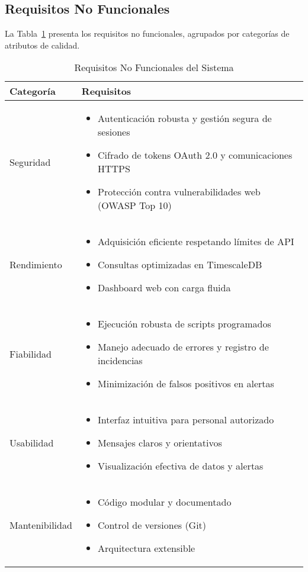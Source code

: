 \subsection{Requisitos No Funcionales}
\label{subsec:requisitos_no_funcionales}

La Tabla~\ref{tab:requisitos_no_funcionales} presenta los requisitos no funcionales, agrupados por categorías de atributos de calidad.
\begin{table}[htbp]
\caption{Requisitos No Funcionales del Sistema}
\label{tab:requisitos_no_funcionales}
\begin{tabular}{|p{}|p{}|}
\hline
\textbf{Categoría} & \textbf{Requisitos} \\
\hline
Seguridad & 
\begin{itemize}
\item Autenticación robusta y gestión segura de sesiones
\item Cifrado de tokens OAuth 2.0 y comunicaciones HTTPS
\item Protección contra vulnerabilidades web (OWASP Top 10)
\end{itemize} \\
\hline
Rendimiento & 
\begin{itemize}
\item Adquisición eficiente respetando límites de API
\item Consultas optimizadas en TimescaleDB
\item Dashboard web con carga fluida
\end{itemize} \\
\hline
Fiabilidad & 
\begin{itemize}
\item Ejecución robusta de scripts programados
\item Manejo adecuado de errores y registro de incidencias
\item Minimización de falsos positivos en alertas
\end{itemize} \\
\hline
Usabilidad & 
\begin{itemize}
\item Interfaz intuitiva para personal autorizado
\item Mensajes claros y orientativos
\item Visualización efectiva de datos y alertas
\end{itemize} \\
\hline
Mantenibilidad & 
\begin{itemize}
\item Código modular y documentado
\item Control de versiones (Git)
\item Arquitectura extensible
\end{itemize} \\
\hline
\end{tabular}
\end{table}

